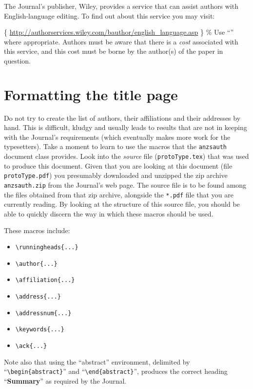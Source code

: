\documentclass[
  times,
  doublespace]{anzsauth}
\providecommand{\tightlist}{%
  \setlength{\itemsep}{0pt}\setlength{\parskip}{0pt}}\usepackage{longtable,booktabs,array}
\begin{document}
The Journal's publisher, Wiley, provides a service that can assist
authors with English-language editing. To find out about this service
you may visit:

\{\small
\url{http://authorservices.wiley.com/bauthor/english_language.asp} \} \%
Use ``\noindent'' where appropriate. \noindent Authors must be aware
that there is a \emph{cost} associated with this service, and this cost
must be borne by the author(s) of the paper in question.

\section{Formatting the title page}\label{sec:titPage}

Do not try to create the list of authors, their affiliations and their
addresses by hand. This is difficult, kludgy and usually leads to
results that are not in keeping with the Journal's requirements (which
eventually makes more work for the typesetters). Take a moment to learn
to use the macros that the \texttt{anzsauth} document class provides.
Look into the \emph{source} file (\texttt{protoType.tex}) that was used
to produce this document. Given that you are looking at this document
(file \texttt{protoType.pdf}) you presumably downloaded and unzipped the
zip archive \texttt{anzsauth.zip} from the Journal's web page. The
source file is to be found among the files obtained from that zip
archive, alongside the \texttt{*.pdf} file that you are currently
reading. By looking at the structure of this source file, you should be
able to quickly discern the way in which these macros should be used.

These macros include:

\begin{itemize}
\tightlist
\item
  \texttt{\textbackslash{}runningheads\{...\}}
\item
  \texttt{\textbackslash{}author\{...\}}
\item
  \texttt{\textbackslash{}affiliation\{...\}}
\item
  \texttt{\textbackslash{}address\{...\}}
\item
  \texttt{\textbackslash{}addressnum\{...\}}
\item
  \texttt{\textbackslash{}keywords\{...\}}
\item
  \texttt{\textbackslash{}ack\{...\}}
\end{itemize}

Note also that using the ``abstract'' environment, delimited by
``\texttt{\textbackslash{}begin\{abstract\}}'' and
``\texttt{\textbackslash{}end\{abstract\}}'', produces the correct
heading ``\textbf{Summary}'' as required by the Journal.
\end{document}
